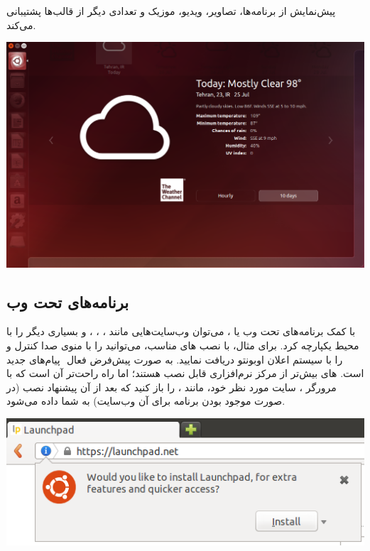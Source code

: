پیش‌نمایش از برنامه‌ها، تصاویر، ویدیو، موزیک و تعدادی دیگر از قالب‌ها پشتیبانی می‌کند.

\begin{center}
\includegraphics[scale=0.45]{pics/26.png}
\end{center}

\subsection{برنامه‌های تحت وب}
با کمک برنامه‌های تحت وب یا ، می‌توان وب‌سایت‌هایی مانند ، ، ،  و بسیاری دیگر را با محیط  یکپارچه کرد. برای مثال، با نصب های مناسب، می‌توانید  را با منوی صدا کنترل و پیام‌های جدید ‎ را با سیستم اعلان اوبونتو دریافت نمایید.   به صورت پیش‌فرض فعال است.  های بیش‌تر از مرکز نرم‌افزاری قابل نصب هستند؛ اما راه راحت‌تر آن است که با مرورگر ، سایت مورد نظر خود، مانند ، را باز کنید که بعد از آن پیشنهاد نصب (در صورت موجود بودن برنامه برای آن وب‌سایت) به شما داده می‌شود.

\begin{center}
\includegraphics[scale=0.6]{pics/27.png}
\end{center}
